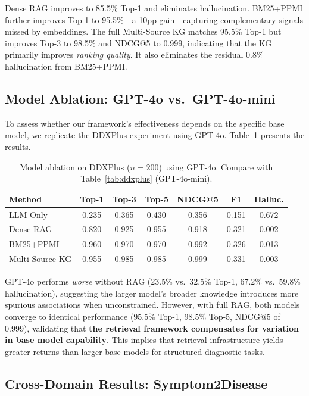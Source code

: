 \documentclass[preprint,12pt]{elsarticle}
\begin{document}
Dense RAG improves to 85.5\% Top-1 and eliminates hallucination. BM25+PPMI further improves Top-1 to 95.5\%---a 10pp gain---capturing complementary signals missed by embeddings. The full Multi-Source KG matches 95.5\% Top-1 but improves Top-3 to 98.5\% and NDCG@5 to 0.999, indicating that the KG primarily improves \emph{ranking quality}. It also eliminates the residual 0.8\% hallucination from BM25+PPMI.

\subsection{Model Ablation: GPT-4o vs.\ GPT-4o-mini}
\label{sec:model_ablation}

To assess whether our framework's effectiveness depends on the specific base model, we replicate the DDXPlus experiment using GPT-4o. Table~\ref{tab:gpt4o} presents the results.

\begin{table}[t]
\centering
\caption{Model ablation on DDXPlus ($n{=}200$) using GPT-4o. Compare with Table~\ref{tab:ddxplus} (GPT-4o-mini).}
\label{tab:gpt4o}
\begin{tabular}{lcccccc}
\toprule
\textbf{Method} & \textbf{Top-1} & \textbf{Top-3} & \textbf{Top-5} & \textbf{NDCG@5} & \textbf{F1} & \textbf{Halluc.} \\
\midrule
LLM-Only       & 0.235 & 0.365 & 0.430 & 0.356 & 0.151 & 0.672 \\
Dense RAG       & 0.820 & 0.925 & 0.955 & 0.918 & 0.321 & 0.002 \\
BM25+PPMI       & 0.960 & 0.970 & 0.970 & 0.992 & 0.326 & 0.013 \\
Multi-Source KG & 0.955 & 0.985 & 0.985 & 0.999 & 0.331 & 0.003 \\
\bottomrule
\end{tabular}
\end{table}

GPT-4o performs \emph{worse} without RAG (23.5\% vs.\ 32.5\% Top-1, 67.2\% vs.\ 59.8\% hallucination), suggesting the larger model's broader knowledge introduces more spurious associations when unconstrained. However, with full RAG, both models converge to identical performance (95.5\% Top-1, 98.5\% Top-5, NDCG@5 of 0.999), validating that \textbf{the retrieval framework compensates for variation in base model capability}. This implies that retrieval infrastructure yields greater returns than larger base models for structured diagnostic tasks.

\subsection{Cross-Domain Results: Symptom2Disease}
\label{sec:cross_domain}
\end{document}
